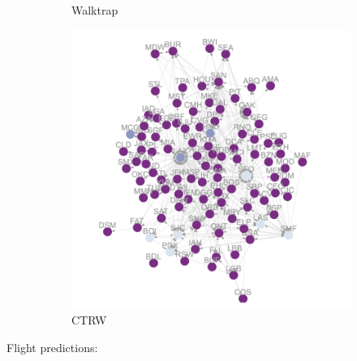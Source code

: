 \documentclass[12pt,a4paper]{article}
\begin{document}
\begin{figure}[H]
\begin{subfigure}[b]{0.3\textwidth}
    \caption{Walktrap}
    \label{fig:flights 100 wt}
  \end{subfigure}
  \hfill
  \begin{subfigure}[b]{0.3\textwidth}
    \centering
    \includegraphics[width=\textwidth]{flight_net/flights partition t100 ctrw.png}
    \caption{CTRW}
    \label{fig:flights 100 dtrw ctrw}
  \end{subfigure}
  \caption{}
  \label{fig:flight predictions t200}
\end{figure}
Flight predictions:
\end{document}
